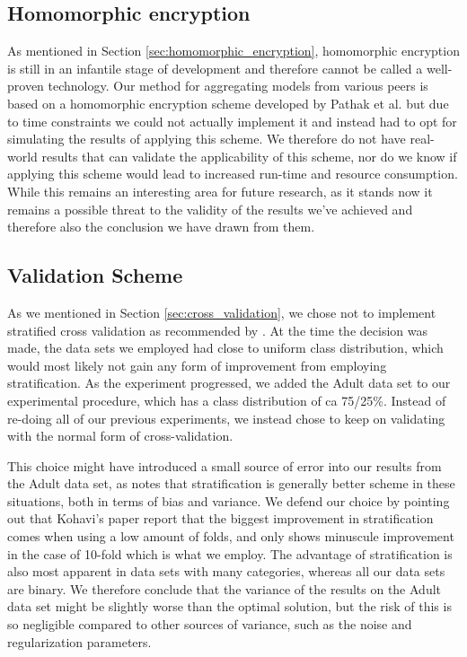 \subsection{Homomorphic encryption}
As mentioned in Section \ref{sec:homomorphic_encryption}, homomorphic encryption is still in an infantile stage of development and therefore cannot be called a well-proven technology. Our method for aggregating models from various peers is based on a homomorphic encryption scheme developed by Pathak et al. but due to time constraints we could not actually implement it and instead had to opt for simulating the results of applying this scheme. We therefore do not have real-world results that can validate the applicability of this scheme, nor do we know if applying this scheme would lead to increased run-time and resource consumption. While this remains an interesting area for future research, as it stands now it remains a possible threat to the validity of the results we've achieved and therefore also the conclusion we have drawn from them.  

\subsection{Validation Scheme}
As we mentioned in Section \ref{sec:cross_validation}, we chose not to implement stratified cross validation as recommended by \cite{kohavi1995crossvalidation}. At the time the decision was made, the data sets we employed had close to uniform class distribution, which would most likely not gain any form of improvement from employing stratification. As the experiment progressed, we added the Adult data set to our experimental procedure, which has a class distribution of ca 75/25\%. Instead of re-doing all of our previous experiments, we instead chose to keep on validating with the normal form of cross-validation. 

This choice might have introduced a small source of error into our results from the Adult data set, as \cite{kohavi1995crossvalidation} notes that stratification is generally better scheme in these situations, both in terms of bias and variance. We defend our choice by pointing out that Kohavi's paper report that the biggest improvement in stratification comes when using a low amount of folds, and only shows minuscule improvement in the case of 10-fold which is what we employ. The advantage of stratification is also most apparent in data sets with many categories, whereas all our data sets are binary. We therefore conclude that the variance of the results on the Adult data set might be slightly worse than the optimal solution, but the risk of this is so negligible compared to other sources of variance, such as the noise and regularization parameters.     

